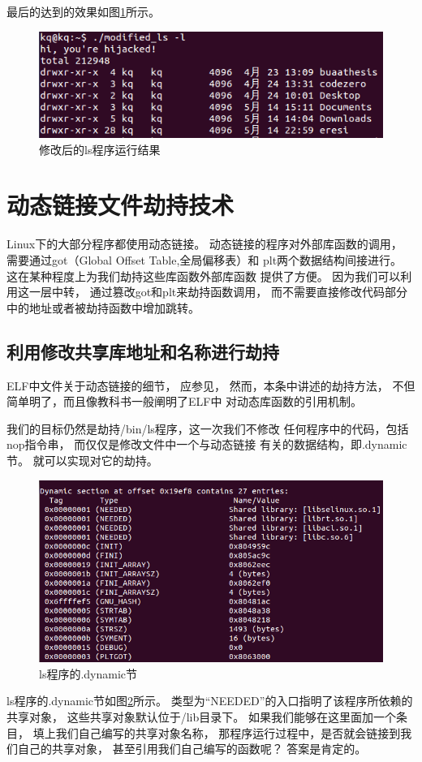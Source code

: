 最后的达到的效果如图\ref{ls}所示。

\begin{figure}[h!]
    \centering
    \includegraphics[width=.6\textwidth]{figure/ls.png}
    \caption{修改后的ls程序运行结果}
    \label{ls}
\end{figure}

\section{动态链接文件劫持技术}

Linux下的大部分程序都使用动态链接。
动态链接的程序对外部库函数的调用，
需要通过got（Global Offset Table,全局偏移表）和
plt两个数据结构间接进行。
这在某种程度上为我们劫持这些库函数外部库函数
提供了方便。
因为我们可以利用这一层中转，
通过篡改got和plt来劫持函数调用，
而不需要直接修改代码部分中的地址或者被劫持函数中增加跳转。

\subsection{利用修改共享库地址和名称进行劫持}

ELF中文件关于动态链接的细节，
应参见\cite{elf1.2}，
然而，本条中讲述的劫持方法，
不但简单明了，而且像教科书一般阐明了ELF中
对动态库函数的引用机制。

我们的目标仍然是劫持/bin/ls程序，这一次我们不修改
任何程序中的代码，包括nop指令串，
而仅仅是修改文件中一个与动态链接
有关的数据结构，即.dynamic节。
就可以实现对它的劫持。
\begin{figure}[h!]
    \centering
    \includegraphics[width=.6\textwidth]{figure/lsdyn1.png}
    \caption{ls程序的.dynamic节}
    \label{lsdyn1}
\end{figure}

ls程序的.dynamic节如图\ref{lsdyn1}所示。
类型为“NEEDED”的入口指明了该程序所依赖的共享对象，
这些共享对象默认位于/lib目录下。
如果我们能够在这里面加一个条目，
填上我们自己编写的共享对象名称，
那程序运行过程中，是否就会链接到我们自己的共享对象，
甚至引用我们自己编写的函数呢？
答案是肯定的。



